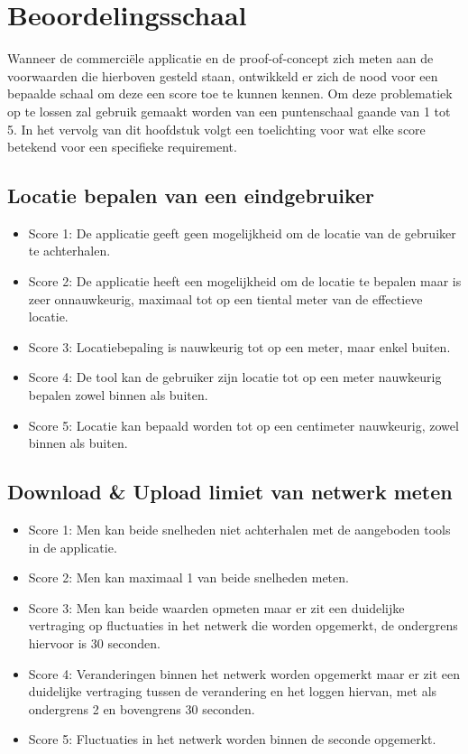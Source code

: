 \section{Beoordelingsschaal}

Wanneer de commerciële applicatie en de proof-of-concept zich meten aan de voorwaarden die hierboven gesteld staan, ontwikkeld er zich de nood voor een bepaalde schaal om deze een score toe te kunnen kennen. Om deze problematiek op te lossen zal gebruik gemaakt worden van een puntenschaal gaande van 1 tot 5. In het vervolg van dit hoofdstuk volgt een toelichting voor wat elke score betekend voor een specifieke requirement.

\subsection{Locatie bepalen van een eindgebruiker}

\begin{itemize}
    \item Score 1: De applicatie geeft geen mogelijkheid om de locatie van de gebruiker te achterhalen.
    \item Score 2: De applicatie heeft een mogelijkheid om de locatie te bepalen maar is zeer onnauwkeurig, maximaal tot op een tiental meter van de effectieve locatie.
    \item Score 3: Locatiebepaling is nauwkeurig tot op een meter, maar enkel buiten.
    \item Score 4: De tool kan de gebruiker zijn locatie tot op een meter nauwkeurig bepalen zowel binnen als buiten.
    \item Score 5: Locatie kan bepaald worden tot op een centimeter nauwkeurig, zowel binnen als buiten.
\end{itemize}

\subsection{Download \& Upload limiet van netwerk meten}

\begin{itemize}
    \item Score 1: Men kan beide snelheden niet achterhalen met de aangeboden tools in de applicatie.
    \item Score 2: Men kan maximaal 1 van beide snelheden meten.
    \item Score 3: Men kan beide waarden opmeten maar er zit een duidelijke vertraging op fluctuaties in het netwerk die worden opgemerkt, de ondergrens hiervoor is 30 seconden.
    \item Score 4: Veranderingen binnen het netwerk worden opgemerkt maar er zit een duidelijke vertraging tussen de verandering en het loggen hiervan, met als ondergrens 2 en bovengrens 30 seconden.
    \item Score 5: Fluctuaties in het netwerk worden binnen de seconde opgemerkt.
\end{itemize}

